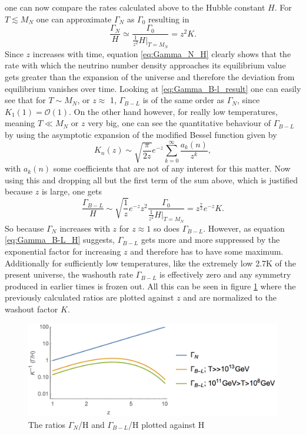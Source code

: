 one can now compare the rates calculated above to the Hubble constant $H$.\newline\indent
For $T\lesssim M_N$ one can approximate $\Gamma_N$ as $\Gamma_0$ resulting in 
\begin{equation}
	\frac{\Gamma_N}{H}\simeq\frac{\Gamma_0}{\frac{1}{z^2}\left.H\right|_{T=M_N}}=z^2K.
	\label{eq:Gamma_N_H}
\end{equation}
Since $z$ increases with time, equation \eqref{eq:Gamma_N_H} clearly shows that the rate with which the neutrino number density approaches its equilibrium value gets greater than the expansion of the universe and therefore the deviation from equilibrium vanishes over time. \newline\indent
Looking at \eqref{eq:Gamma_B-l_result} one can easily see that for $T \sim M_N$, or $z\approx$ 1, $\Gamma_{B-L}$ is of the same order as $\Gamma_N$, since $K_1(1)=\mathcal{O}(1)$. On the other hand however, for really low temperatures, meaning $T\ll M_N$ or $z$ very big, one can see the quantitative behaviour of $\Gamma_{B-L}$ by using the asymptotic expansion of the modified Bessel function given by
\begin{equation*}
	K_{n}(z)\sim\sqrt{\frac{\pi}{2z}}e^{-z}\sum_{k=0}^{\infty}\frac{a_{k}(n)}{z^k},
\end{equation*}
with $a_{k}(n)$ some coefficients that are not of any interest for this matter. Now using this and dropping all but the first term of the sum above, which is justified because $z$ is large, one gets
\begin{equation}
	\frac{\Gamma_{B-L}}{H}\sim\sqrt{\frac{1}{z}}e^{-z}z^2\frac{\Gamma_0}{\frac{1}{z^2}\left.H\right|_{T=M_{N}}}=z^\frac{7}{2}e^{-z}K.
	\label{eq:Gamma_B-L_H}
\end{equation}
So because $\Gamma_N$ increases with $z$ for $z\approx1$ so does $\Gamma_{B-L}$. However, as equation \eqref{eq:Gamma_B-L_H} suggests, $\Gamma_{B-L}$ gets more and more suppressed by the exponential factor for increasing $z$ and therefore has to have some maximum. Additionally for sufficiently low temperatures, like the extremely low 2.7K of the present universe, the washouth rate $\Gamma_{B-L}$ is effectively zero and any symmetry produced in earlier times is frozen out. 
All this can be seen in figure \ref{fig:rates} where the previously calculated ratios are plotted against $z$ and are normalized to the washout factor $K$.
\begin{figure}[H]
	\centering
	\includegraphics[width=0.8\linewidth]{Images/rates}
	\caption{The ratios $\Gamma_{N}$/H and $\Gamma_{B-L}$/H plotted against H}
	\label{fig:rates}
\end{figure}
